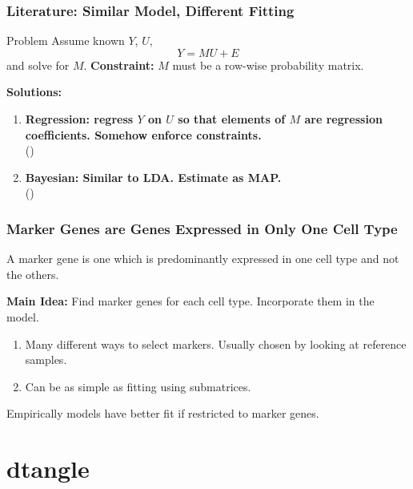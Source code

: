 \documentclass[usenames,dvipsnames,15pt]{beamer}
\begin{document}
\begin{frame}
  \frametitle{Literature: Similar Model, Different Fitting}
  \begin{block}{Problem}
    Assume known $Y$, $U$,
    \[
    Y = MU + E
    \]
    and solve for $M$.
    {\bf Constraint:} $M$ must be a row-wise probability matrix. 
  \end{block}\vspace{-.25cm}
  {\bf Solutions:}
  \begin{enumerate}
  \item {\bf{\color{blue}Regression}: regress $Y$ on $U$ so that elements of $M$ are regression coefficients. Somehow enforce constraints.}\\ (\citeauthor{Abbas2009,Gong2011,Lu2003,Wang2006,Qiao2012,Altboum2014,Newman2015})
  \item {\bf {\color{blue}Bayesian}: Similar to LDA. Estimate as MAP.} \\(\citeauthor{Quon2009,Qiao2012,Quon2013})
  \end{enumerate}

  \begin{center}
  \end{center}
\end{frame}

\begin{frame}
  \frametitle{Marker Genes are Genes Expressed in Only One Cell Type}

  A \alert{marker gene} is one which is predominantly expressed in one cell type and not the others.

  {\bf Main Idea:} Find marker genes for each cell type. Incorporate them in the model. 
  \begin{enumerate}
  \item Many different ways to select markers. Usually chosen by looking at \alert{reference samples}.
  \item Can be as simple as fitting using submatrices.
  \end{enumerate}


  {\color{blue}Empirically models have better fit if restricted to marker genes.\newline}

    
\end{frame}

\setcounter{subsection}{0}
\section{dtangle}
\end{document}
